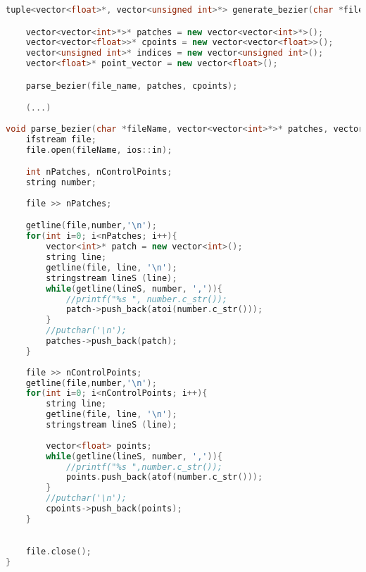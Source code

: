 \documentclass[14pt, a4 paper]{report}
\begin{document}
\begin{lstlisting}[language=c++]
tuple<vector<float>*, vector<unsigned int>*> generate_bezier(char *file_name, float tessellation_level){

    vector<vector<int>*>* patches = new vector<vector<int>*>();
    vector<vector<float>>* cpoints = new vector<vector<float>>();
    vector<unsigned int>* indices = new vector<unsigned int>();
    vector<float>* point_vector = new vector<float>();

    parse_bezier(file_name, patches, cpoints);

    (...)
    
void parse_bezier(char *fileName, vector<vector<int>*>* patches, vector<vector<float>>* cpoints){
    ifstream file;
    file.open(fileName, ios::in);

    int nPatches, nControlPoints;
    string number;
    
    file >> nPatches;

    getline(file,number,'\n');
    for(int i=0; i<nPatches; i++){
        vector<int>* patch = new vector<int>();
        string line;
        getline(file, line, '\n');
        stringstream lineS (line);
        while(getline(lineS, number, ',')){
            //printf("%s ", number.c_str());
            patch->push_back(atoi(number.c_str()));
        }
        //putchar('\n');
        patches->push_back(patch);
    }
    
    file >> nControlPoints;
    getline(file,number,'\n');
    for(int i=0; i<nControlPoints; i++){
        string line;
        getline(file, line, '\n');
        stringstream lineS (line);
        
        vector<float> points;
        while(getline(lineS, number, ',')){
            //printf("%s ",number.c_str());
            points.push_back(atof(number.c_str()));
        }
        //putchar('\n');
        cpoints->push_back(points);
    }

    
    file.close();
}
\end{lstlisting}
\end{document}
